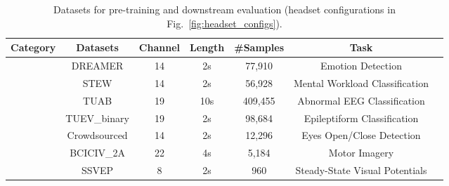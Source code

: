 \documentclass{article} %
\begin{document}
\begin{table}[ht]
    \centering
    \caption{Datasets for pre-training and downstream evaluation (headset configurations in Fig.~\ref{fig:headset_configs}).}
    \vspace{-0.4cm}
    {\footnotesize  %
    \setlength\extrarowheight{1pt}
    \begin{tabular}{lcccccc}
        \hline
        \textbf{Category} & {\footnotesize \textbf{Datasets}} & \textbf{Channel} & \textbf{Length} & \textbf{\#Samples} & {\footnotesize \textbf{Task}} \\
        \hline \hline
         & {\footnotesize DREAMER} & 14 & 2s & 77,910 & {\footnotesize Emotion Detection} \\
        & {\footnotesize STEW} & 14 & 2s & 56,928 & {\footnotesize Mental Workload Classification} \\
        & {\footnotesize TUAB} & 19 & 10s & 409,455 & {\footnotesize Abnormal EEG Classification} \\
        & {\footnotesize TUEV\_binary} & 19 & 2s & 98,684 & {\footnotesize Epileptiform Classification}  \\
        \hline 
         & {\footnotesize Crowdsourced} & 14 & 2s & 12,296 & {\footnotesize Eyes Open/Close Detection} \\
        & {\footnotesize BCICIV\_2A} & 22 & 4s & 5,184 & {\footnotesize Motor Imagery} \\
        & {\footnotesize SSVEP} & 8 & 2s & 960 & {\footnotesize Steady-State Visual Potentials} \\
        
        \hline
    \end{tabular}
    } %
    \vspace{-0.5cm}
    \label{tbl:data}
\end{table}
\end{document}
